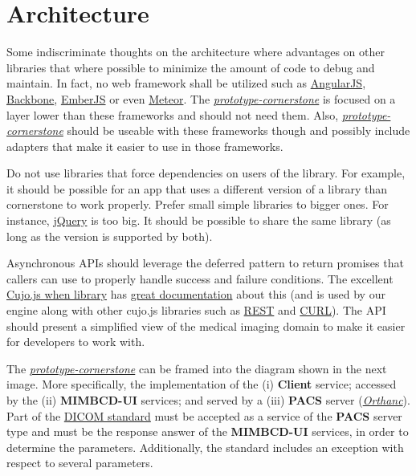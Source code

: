 \documentclass{tufte-book} %
\begin{document}
\chapter{Architecture}

Some indiscriminate thoughts on the architecture where advantages on other libraries that where possible to minimize the amount of code to debug and maintain. In fact, no web framework shall be utilized such as \href{https://angularjs.org/}{AngularJS}, \href{http://backbonejs.org/}{Backbone}, \href{https://www.emberjs.com/}{EmberJS} or even \href{https://www.meteor.com/}{Meteor}. The \href{https://github.com/MIMBCD-UI/prototype-cornerstone}{\textit{prototype-cornerstone}} is focused on a layer lower than these frameworks and should not need them. Also, \href{https://github.com/MIMBCD-UI/prototype-cornerstone}{\textit{prototype-cornerstone}} should be useable with these frameworks though and possibly include adapters that make it easier to use in those frameworks.

Do not use libraries that force dependencies on users of the library. For example, it should be possible for an app that uses a different version of a library than cornerstone to work properly. Prefer small simple libraries to bigger ones. For instance, \href{https://jquery.com/}{jQuery} is too big. It should be possible to share the same library (as long as the version is supported by both).

Asynchronous APIs should leverage the deferred pattern to return promises that callers can use to properly handle success and failure conditions. The excellent \href{https://github.com/cujojs/when}{Cujo.js when library} has \href{https://github.com/cujojs/when/wiki}{great documentation} about this (and is used by our engine along with other cujo.js libraries such as \href{https://github.com/cujojs/rest}{REST} and \href{https://github.com/cujojs/curl}{CURL}). The API should present a simplified view of the medical imaging domain to make it easier for developers to work with.

The \href{https://github.com/MIMBCD-UI/prototype-cornerstone}{\textit{prototype-cornerstone}} can be framed into the diagram shown in the next image. More specifically, the implementation of the (i) \textbf{Client} service; accessed by the (ii) \textbf{MIMBCD-UI} services; and served by a (iii) \textbf{PACS} server (\href{https://www.orthanc-server.com/}{\textit{Orthanc}}). Part of the \href{https://www.dicomstandard.org/}{DICOM standard} must be accepted as a service of the \textbf{PACS} server type and must be the response answer of the \textbf{MIMBCD-UI} services, in order to determine the parameters. Additionally, the standard includes an exception with respect to several parameters.
\end{document}
